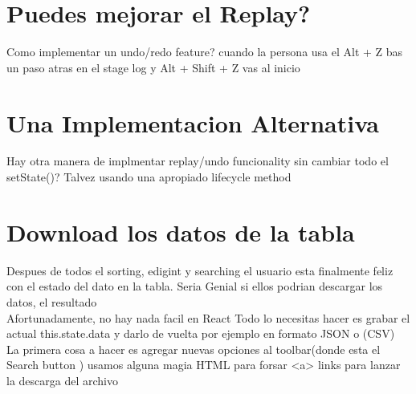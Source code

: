 \section{Puedes mejorar el Replay?}
Como implementar un undo/redo feature? cuando la persona usa el Alt + Z bas un paso atras en el stage log y Alt + Shift + Z vas al inicio
\section{Una Implementacion Alternativa}
Hay otra manera de implmentar replay/undo funcionality sin cambiar todo el setState()? Talvez usando una apropiado lifecycle method
\section{Download los datos de la tabla}
Despues de todos el sorting, edigint y searching el usuario esta finalmente feliz con el estado del dato en la tabla. Seria Genial si ellos podrian descargar los datos, el resultado\\
Afortunadamente, no hay nada facil en React Todo lo necesitas hacer es grabar el actual this.state.data y darlo de vuelta por ejemplo en formato JSON o (CSV) 
\\
La primera cosa a hacer es agregar nuevas opciones al toolbar(donde esta el Search button ) usamos alguna magia HTML para forsar <a> links para lanzar la descarga del archivo
